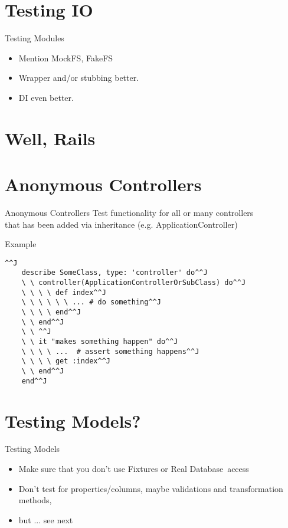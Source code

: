\documentclass[style=paintings,display=slides,clock]{powerdot}
\begin{document}
\section{Testing IO}
\begin{note}{Testing Modules}
	\begin{itemize}
		\item Mention MockFS, FakeFS
		\item Wrapper and/or stubbing better.
		\item DI even better.
	\end{itemize}
\end{note}
\section{Well, Rails}
\section{Anonymous Controllers}
\begin{note}{Anonymous Controllers}
	Test functionality for all or many controllers \\
	that has been added via inheritance (e.g. ApplicationController)
\end{note}
\begin{slide}{Example}
	\begin{lstlisting}[frame=shadowbox]^^J
	describe SomeClass, type: 'controller' do^^J
	\ \ controller(ApplicationControllerOrSubClass) do^^J
	\ \ \ \ def index^^J
	\ \ \ \ \ \ ... # do something^^J
	\ \ \ \ end^^J
	\ \ end^^J
	\ \ ^^J
	\ \ it "makes something happen" do^^J
	\ \ \ \ ...  # assert something happens^^J
	\ \ \ \ get :index^^J
	\ \ end^^J
	end^^J
	\end{lstlisting}
\end{slide}
\section{Testing Models?}
\begin{note}{Testing Models}
	\begin{itemize}
		\item Make sure that you don't use Fixtures or Real Database\texttrademark\  access
		\item Don't test for properties/columns, maybe validations and transformation methods, 
		\item but ... see next
	\end{itemize}
\end{note}
\end{document}
